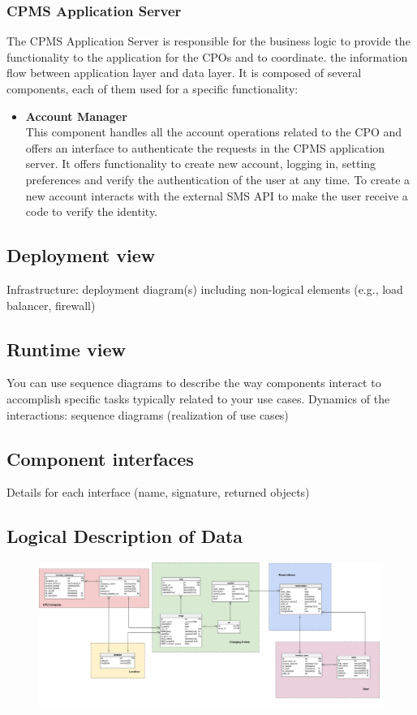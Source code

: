 \subsubsection{CPMS Application Server}
The CPMS Application Server is responsible for the business logic to provide the functionality to the application for the CPOs and to coordinate.
the information flow between application layer and data layer.
It is composed of several components, each of them used for a specific functionality:\\
\begin{itemize}
    \item \textbf{Account Manager} \\ This component handles all the account operations related to the CPO and offers an interface to authenticate the requests in the CPMS application server.
          It offers functionality to create new account, logging in, setting preferences and verify the authentication of the user at any time.
          To create a new account interacts with the external SMS API to make the user receive a code to verify the identity.
\end{itemize}

\subsection{Deployment view}
Infrastructure: deployment diagram(s) including non-logical elements (e.g., load balancer, firewall)

\subsection{Runtime view}
You can use sequence diagrams to describe the way components interact to accomplish specific tasks typically related to your use cases. Dynamics of the interactions: sequence
diagrams (realization of use cases)

\subsection{Component interfaces}
Details for each interface (name, signature, returned objects)

\subsection{Logical Description of Data}
\begin{figure}[H]
    \includegraphics[scale=0.35]{src/ERDiagram/er_diagram.png}
\end{figure}

